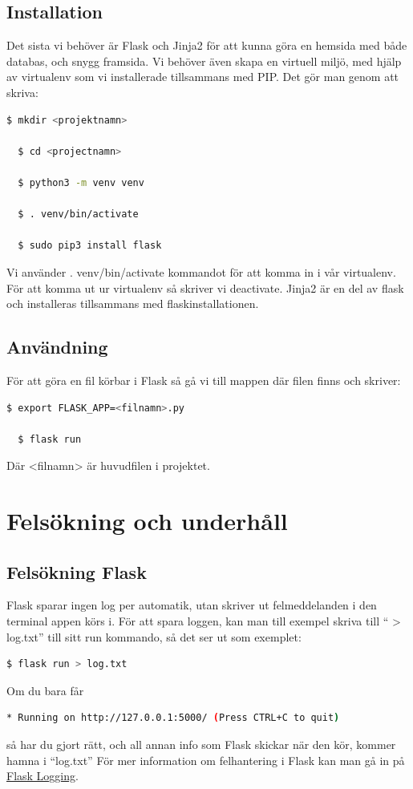 \documentclass{TDP003mall}
\begin{document}
\subsection{Installation}
Det sista vi behöver är Flask och Jinja2 för att kunna göra en hemsida med både
databas, och snygg framsida. Vi behöver även skapa en virtuell miljö, med hjälp
av virtualenv som vi installerade tillsammans med PIP. Det gör man genom att skriva:
\begin{lstlisting}[language=bash]
  $ mkdir <projektnamn>

  $ cd <projectnamn>

  $ python3 -m venv venv

  $ . venv/bin/activate

  $ sudo pip3 install flask
\end{lstlisting}
Vi använder . venv/bin/activate kommandot för att komma in i vår virtualenv.
För att komma ut ur virtualenv så skriver vi deactivate.
Jinja2 är en del av flask och installeras tillsammans med flaskinstallationen.

\subsection{Användning}
För att göra en fil körbar i Flask så gå vi till mappen där filen finns och skriver:
\begin{lstlisting}[language=bash]
  $ export FLASK_APP=<filnamn>.py

  $ flask run
\end{lstlisting}
Där <filnamn> är huvudfilen i projektet.

\section{Felsökning och underhåll}
\subsection{Felsökning Flask}
Flask sparar ingen log per automatik, utan skriver ut felmeddelanden i den terminal
appen körs i. För att spara loggen, kan man till exempel skriva till `` > log.txt''
till sitt run kommando, så det ser ut som exemplet:
\begin{lstlisting}[language=bash]
  $ flask run > log.txt
\end{lstlisting}
Om du bara får
\begin{lstlisting}[language=bash]
  * Running on http://127.0.0.1:5000/ (Press CTRL+C to quit)
\end{lstlisting}
så har du gjort rätt, och all annan info som Flask skickar när den kör, kommer hamna i
``log.txt''
För mer information om felhantering i
Flask kan man gå in på \href{http://flask.pocoo.org/docs/1.0/errorhandling/#application-errors}{Flask Logging}.
\end{document}
